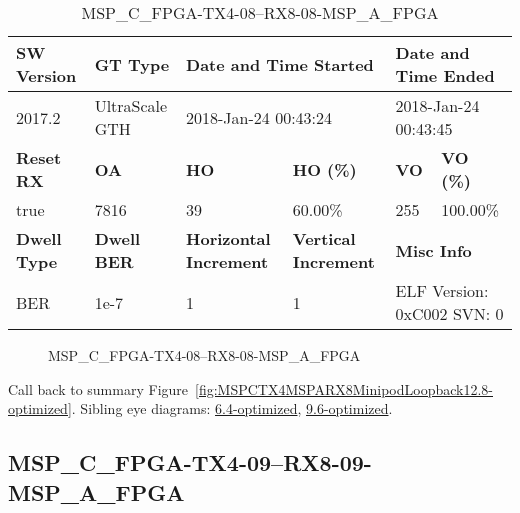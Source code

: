 \begin{table}[h]
\centering
\caption{MSP\_C\_FPGA-TX4-08--RX8-08-MSP\_A\_FPGA}
\label{tab:MSPCFPGATX408RX808MSPAFPGA12.8-optimized}
\begin{tabular}{@{}|l|l|l|l|l|l|@{}}
\toprule
\textbf{SW Version}                & \textbf{GT Type}   & \multicolumn{2}{l|}{\textbf{Date and Time Started}}            & \multicolumn{2}{l|}{\textbf{Date and Time Ended}}        \\ \midrule
2017.2                       & UltraScale GTH          & \multicolumn{2}{l|}{2018-Jan-24 00:43:24}                   & \multicolumn{2}{l|}{2018-Jan-24 00:43:45}               \\ \midrule
\textbf{Reset RX}                  & \textbf{OA} & \textbf{HO}   & \textbf{HO (\%)} & \textbf{VO} & \textbf{VO (\%)} \\ \midrule
true & 7816        & 39          & 60.00\%        & 255        & 100.00\%       \\ \midrule
\textbf{Dwell Type}                & \textbf{Dwell BER} & \textbf{Horizontal Increment} & \textbf{Vertical Increment}    & \multicolumn{2}{l|}{\textbf{Misc Info}}                  \\ \midrule
BER                            & 1e-7        & 1        & 1           & \multicolumn{2}{l|}{ELF Version: 0xC002 SVN: 0}                         \\ \bottomrule
\end{tabular}
\end{table}

\begin{figure}[h]
\caption{MSP\_C\_FPGA-TX4-08--RX8-08-MSP\_A\_FPGA} \label{fig:MSPCFPGATX408RX808MSPAFPGA12.8-optimized}
\end{figure}

Call back to summary Figure~\ref{fig:MSPCTX4MSPARX8MinipodLoopback12.8-optimized}.
Sibling eye diagrams: \hyperref[sec:MSPCFPGATX408RX808MSPAFPGA6.4-optimized]{6.4-optimized}, \hyperref[sec:MSPCFPGATX408RX808MSPAFPGA9.6-optimized]{9.6-optimized}.

\clearpage
\newpage


\subsection{MSP\_C\_FPGA-TX4-09--RX8-09-MSP\_A\_FPGA}\label{sec:MSPCFPGATX409RX809MSPAFPGA12.8-optimized}

